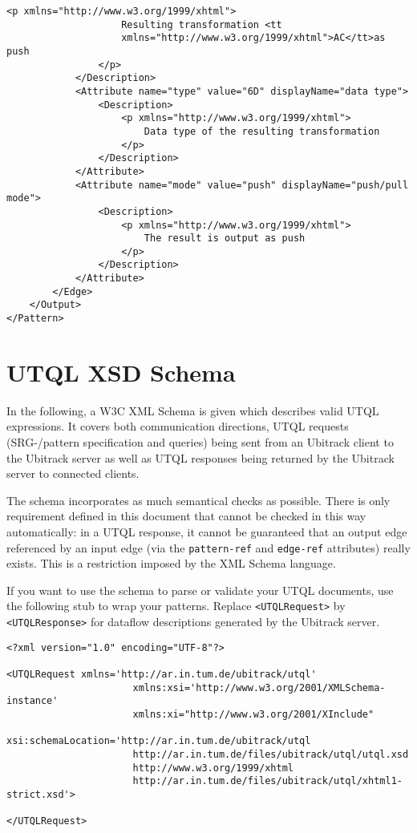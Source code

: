 \documentclass[11pt]{article}
\begin{document}
\begin{Verbatim}[fontsize=\footnotesize,tabsize=2]
                <p xmlns="http://www.w3.org/1999/xhtml">
                    Resulting transformation <tt
                    xmlns="http://www.w3.org/1999/xhtml">AC</tt>as push
                </p>
            </Description>
            <Attribute name="type" value="6D" displayName="data type">
                <Description>
                    <p xmlns="http://www.w3.org/1999/xhtml">
                        Data type of the resulting transformation
                    </p>
                </Description>
            </Attribute>
            <Attribute name="mode" value="push" displayName="push/pull mode">
                <Description>
                    <p xmlns="http://www.w3.org/1999/xhtml">
                        The result is output as push
                    </p>
                </Description>
            </Attribute>
        </Edge>
    </Output>
</Pattern>
\end{Verbatim}

\appendix

\section{UTQL XSD Schema}
\label{schema}
In the following, a W3C XML Schema is given which describes valid UTQL expressions. It covers both communication directions, UTQL requests (SRG-/pattern specification and queries) being sent from an Ubitrack client to the Ubitrack server as well as UTQL responses being returned by the Ubitrack server to connected clients.

The schema incorporates as much semantical checks as possible. There is only requirement defined in this document that cannot be checked in this way automatically: in a UTQL response, it cannot be guaranteed that an output edge referenced by an input edge (via the \texttt{pattern-ref} and \texttt{edge-ref} attributes) really exists. This is a restriction imposed by the XML Schema language.

If you want to use the schema to parse or validate your UTQL documents, use the following stub to wrap your patterns. Replace \texttt{<UTQLRequest>} by \texttt{<UTQLResponse>} for dataflow descriptions generated by the Ubitrack server.

\begin{Verbatim}[fontsize=\footnotesize,tabsize=2]
<?xml version="1.0" encoding="UTF-8"?>

<UTQLRequest xmlns='http://ar.in.tum.de/ubitrack/utql'
                      xmlns:xsi='http://www.w3.org/2001/XMLSchema-instance'
                      xmlns:xi="http://www.w3.org/2001/XInclude"
                      xsi:schemaLocation='http://ar.in.tum.de/ubitrack/utql
                      http://ar.in.tum.de/files/ubitrack/utql/utql.xsd
                      http://www.w3.org/1999/xhtml
                      http://ar.in.tum.de/files/ubitrack/utql/xhtml1-strict.xsd'>

</UTQLRequest>
\end{Verbatim}
\end{document}
